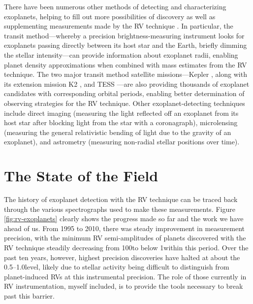 There have been numerous other methods of detecting and characterizing exoplanets, helping to fill out more possibilities of discovery as well as supplementing measurements made by the RV technique \citep{fischer_exoplanet_2014}. In particular, the transit method---whereby a precision brightness-measuring instrument looks for exoplanets passing directly between its host star and the Earth, briefly dimming the stellar intensity---can provide information about exoplanet radii, enabling planet density approximations when combined with mass estimates from the RV technique. The two major transit method satellite missions---Kepler \citep{borucki_kepler_2010}, along with its extension mission K2 \citep{howell_k2_2014}, and TESS \citep{ricker_transiting_2014}---are also providing thousands of exoplanet candidates with corresponding orbital periods, enabling better determination of observing strategies for the RV technique. Other exoplanet-detecting techniques include direct imaging (measuring the light reflected off an exoplanet from its host star after blocking light from the star with a coronagraph), microlensing (measuring the general relativistic bending of light due to the gravity of an exoplanet), and astrometry (measuring non-radial stellar positions over time).

\section{The State of the Field}

The history of exoplanet detection with the RV technique can be traced back through the various spectrographs used to make these measurements. Figure \ref{fig:rv-exoplanets} clearly shows the progress made so far and the work we have ahead of us. From 1995 to 2010, there was steady improvement in measurement precision, with the minimum RV semi-amplitudes of planets discovered with the RV technique steadily decreasing from 100\ms to below 1\ms within this period. Over the past ten years, however, highest precision discoveries have halted at about the 0.5--1.0\ms level, likely due to stellar activity being difficult to distinguish from planet-induced RVs at this instrumental precision. The role of those currently in RV instrumentation, myself included, is to provide the tools necessary to break past this barrier.

